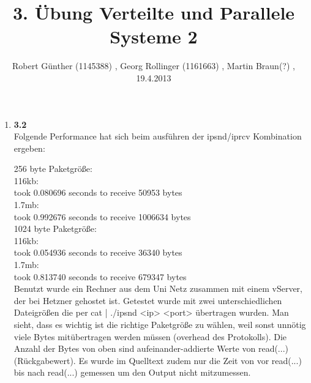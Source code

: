 \documentclass[10pt,a4paper]{article} [2003/01/01]
\title{3. Übung Verteilte und Parallele Systeme 2}
\author{ Robert Günther (1145388) , Georg Rollinger (1161663) , Martin Braun(?) , 19.4.2013}
\date{}
\begin{document}
\maketitle
\begin{enumerate}

\item[]{\textbf{3.2}
\\Folgende Performance hat sich beim ausführen der ipsnd/iprcv Kombination ergeben:

256 byte Paketgröße:\\
	116kb:\\
	took 0.080696 seconds to receive 50953 bytes\\
	1.7mb:\\
	took 0.992676 seconds to receive 1006634 bytes\\
1024 byte Paketgröße:\\
	116kb:\\
	took 0.054936 seconds to receive 36340 bytes\\
	1.7mb:\\
	took 0.813740 seconds to receive 679347 bytes\\

Benutzt wurde ein Rechner aus dem Uni Netz zusammen mit einem vServer,
der bei Hetzner gehostet ist. Getestet wurde mit zwei unterschiedlichen
Dateigrößen die per cat | ./ipsnd <ip> <port> übertragen wurden. Man
sieht, dass es wichtig ist die richtige Paketgröße zu wählen, weil sonst
unnötig viele Bytes mitübertragen werden müssen (overhead des Protokolls).
Die Anzahl der Bytes von oben sind aufeinander-addierte Werte von read(...)
(Rückgabewert). Es wurde im Quelltext zudem nur die Zeit von vor read(...)
bis nach read(...) gemessen um den Output nicht mitzumessen.

}



\end{enumerate}
\end{document}
